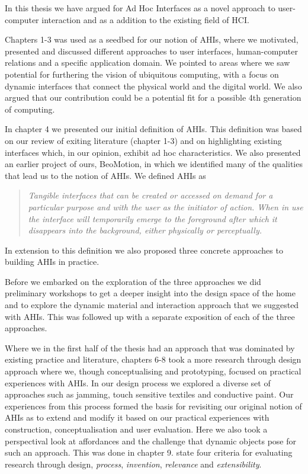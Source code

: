 
In this thesis we have argued for Ad Hoc Interfaces as a novel approach to user-computer interaction and as a addition to the existing field of HCI.

Chapters 1-3 was used as a seedbed for our notion of AHIs, where we motivated, presented and discussed different approaches to user interfaces, human-computer relations and a specific application domain.
We pointed to areas where we saw potential for furthering the vision of ubiquitous computing, with a focus on dynamic interfaces that connect the physical world and the digital world.
We also argued that our contribution could be a potential fit for a possible 4th generation of computing.  

In chapter 4 we presented our initial definition of AHIs.
This definition was based on our review of exiting literature (chapter 1-3) and on highlighting existing interfaces which, in our opinion, exhibit ad hoc characteristics.
We also presented an earlier project of ours, BeoMotion, in which we identified many of the qualities that lead us to the notion of AHIs.
We defined AHIs as 

\begin{quotation}
\emph{Tangible interfaces that can be created or accessed on demand for a particular purpose and with the user as the initiator of action. When in use the interface will temporarily emerge to the foreground after which it disappears into the background, either physically or perceptually.}
\end{quotation}
In extension to this definition we also proposed three concrete approaches to building AHIs in practice.

Before we embarked on the exploration of the three approaches we did preliminary workshops to get a deeper insight into the design space of the home and to explore the dynamic material and interaction approach that we suggested with AHIs.
This was followed up with a separate exposition of each of the three approaches.

Where we in the first half of the thesis had an approach that was dominated by existing practice and literature, chapters 6-8 took a more research through design approach where we, though conceptualising and prototyping, focused on practical experiences with AHIs.
In our design process we explored a diverse set of approaches such as jamming, touch sensitive textiles and conductive paint.
Our experiences from this process formed the basis for revisiting our original notion of AHIs as to extend and modify it based on our practical experiences with construction, conceptualisation and user evaluation.
Here we also took a perspectival look at affordances and the challenge that dynamic objects pose for such an approach.
This was done in chapter 9.
\blank
\citet{zimmerman2007research} state four criteria for evaluating research through design, \emph{process}, \emph{invention}, \emph{relevance} and \emph{extensibility}.

